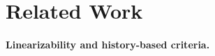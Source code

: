 
\section{Related Work}
\label{sec:related}




\paragraph{Linearizability and history-based criteria.}


